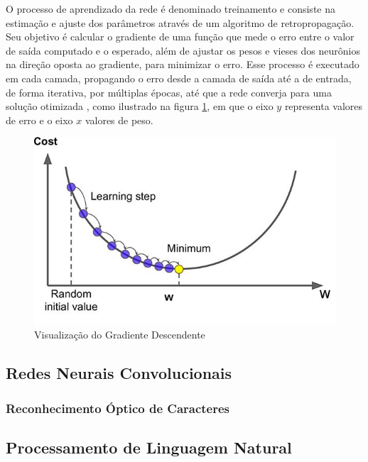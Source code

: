 O processo de aprendizado da rede é denominado treinamento e consiste na estimação e ajuste dos parâmetros através de um algoritmo de retropropagação. Seu objetivo é calcular o gradiente de uma função que mede o erro entre o valor de saída computado e o esperado, além de ajustar os pesos e vieses dos neurônios na direção oposta ao gradiente, para minimizar o erro. Esse processo é executado em cada camada, propagando o erro desde a camada de saída até a de entrada, de forma iterativa, por múltiplas épocas, até que a rede converja para uma solução otimizada \cite{deeplearningbook}, como ilustrado na figura \ref{fig:gradientdescent}, em que o eixo $y$ representa valores de erro e o eixo $x$ valores de peso.

\begin{figure}[H]
	\caption{\label{fig:gradientdescent}Visualização do Gradiente Descendente}
    \begin{center}
    \includegraphics[width=1\linewidth]{images/gradientdescent.jpg}
	\end{center}
\end{figure}


\subsection{Redes Neurais Convolucionais}

\subsubsection{Reconhecimento Óptico de Caracteres}

\subsection{Processamento de Linguagem Natural}

